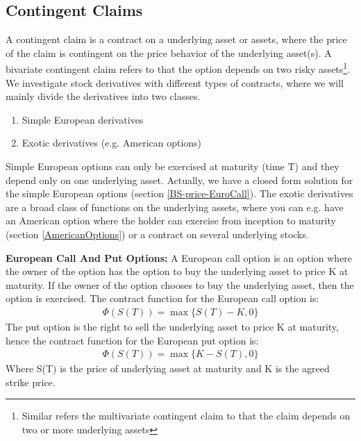 
\subsection{Contingent Claims}
A contingent claim is a contract on a underlying asset or assets, where the price of the claim is contingent on the price behavior of the underlying asset(s). A bivariate contingent claim refers to that the option depends on two risky assets\footnote{Similar refers the multivariate contingent claim to that the claim depends on two or more underlying assets}. We investigate stock derivatives with different types of contracts, where we will mainly divide the derivatives into two classes. 
\begin{enumerate}
\item Simple European derivatives
\item Exotic derivatives (e.g. American options)
\end{enumerate}
Simple European options can only be exercised at maturity (time T) and they depend only on one underlying asset. Actually, we have a closed form solution for the simple European options (section \ref{BS-price-EuroCall}). The exotic derivatives are a broad class of functions on the underlying assets, where you can e.g. have an American option where the holder can exercise from inception to maturity (section \ref{AmericanOptions}) or a contract on several underlying stocks.

\theoremstyle{definition}
\begin{definition}{\textbf{European Call And Put Options:}}\label{def:CallOptions}
A European call option is an option where the owner of the option has the option to buy the underlying asset to price K at maturity. If the owner of the option chooses to buy the underlying asset, then the option is exercised. The contract function for the European call option is:
\begin{equation*}
\begin{split}
\Phi(S(T))=\max\{S(T)-K, 0\}
\end{split}
\end{equation*}
The put option is the right to sell the underlying asset to price K at maturity, hence the contract function for the European put option is:
\begin{equation*}
\begin{split}
\Phi(S(T))=\max\{K-S(T), 0\}
\end{split}
\end{equation*}
Where S(T) is the price of underlying asset at maturity and K is the agreed strike price.
\end{definition}

